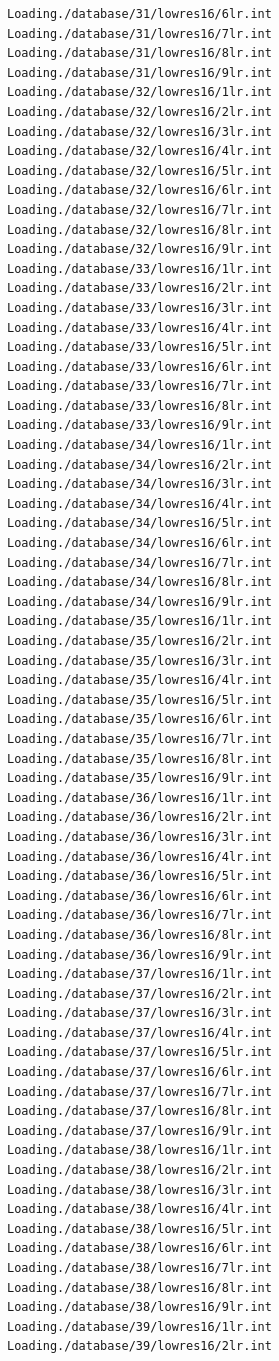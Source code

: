 \documentclass[a4paper,11pt,titlepage]{article}
\begin{document}
\begin{verbatim}
Loading./database/31/lowres16/6lr.int
Loading./database/31/lowres16/7lr.int
Loading./database/31/lowres16/8lr.int
Loading./database/31/lowres16/9lr.int
Loading./database/32/lowres16/1lr.int
Loading./database/32/lowres16/2lr.int
Loading./database/32/lowres16/3lr.int
Loading./database/32/lowres16/4lr.int
Loading./database/32/lowres16/5lr.int
Loading./database/32/lowres16/6lr.int
Loading./database/32/lowres16/7lr.int
Loading./database/32/lowres16/8lr.int
Loading./database/32/lowres16/9lr.int
Loading./database/33/lowres16/1lr.int
Loading./database/33/lowres16/2lr.int
Loading./database/33/lowres16/3lr.int
Loading./database/33/lowres16/4lr.int
Loading./database/33/lowres16/5lr.int
Loading./database/33/lowres16/6lr.int
Loading./database/33/lowres16/7lr.int
Loading./database/33/lowres16/8lr.int
Loading./database/33/lowres16/9lr.int
Loading./database/34/lowres16/1lr.int
Loading./database/34/lowres16/2lr.int
Loading./database/34/lowres16/3lr.int
Loading./database/34/lowres16/4lr.int
Loading./database/34/lowres16/5lr.int
Loading./database/34/lowres16/6lr.int
Loading./database/34/lowres16/7lr.int
Loading./database/34/lowres16/8lr.int
Loading./database/34/lowres16/9lr.int
Loading./database/35/lowres16/1lr.int
Loading./database/35/lowres16/2lr.int
Loading./database/35/lowres16/3lr.int
Loading./database/35/lowres16/4lr.int
Loading./database/35/lowres16/5lr.int
Loading./database/35/lowres16/6lr.int
Loading./database/35/lowres16/7lr.int
Loading./database/35/lowres16/8lr.int
Loading./database/35/lowres16/9lr.int
Loading./database/36/lowres16/1lr.int
Loading./database/36/lowres16/2lr.int
Loading./database/36/lowres16/3lr.int
Loading./database/36/lowres16/4lr.int
Loading./database/36/lowres16/5lr.int
Loading./database/36/lowres16/6lr.int
Loading./database/36/lowres16/7lr.int
Loading./database/36/lowres16/8lr.int
Loading./database/36/lowres16/9lr.int
Loading./database/37/lowres16/1lr.int
Loading./database/37/lowres16/2lr.int
Loading./database/37/lowres16/3lr.int
Loading./database/37/lowres16/4lr.int
Loading./database/37/lowres16/5lr.int
Loading./database/37/lowres16/6lr.int
Loading./database/37/lowres16/7lr.int
Loading./database/37/lowres16/8lr.int
Loading./database/37/lowres16/9lr.int
Loading./database/38/lowres16/1lr.int
Loading./database/38/lowres16/2lr.int
Loading./database/38/lowres16/3lr.int
Loading./database/38/lowres16/4lr.int
Loading./database/38/lowres16/5lr.int
Loading./database/38/lowres16/6lr.int
Loading./database/38/lowres16/7lr.int
Loading./database/38/lowres16/8lr.int
Loading./database/38/lowres16/9lr.int
Loading./database/39/lowres16/1lr.int
Loading./database/39/lowres16/2lr.int

\end{verbatim}
\end{document}
